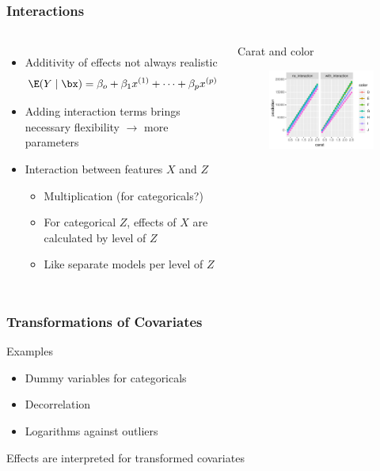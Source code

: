 \begin{frame}
	\frametitle{Interactions}
	\begin{columns}
		\begin{itemize}
			\item Additivity of effects not always realistic
			$$
			\E(Y \mid \bx) = \beta_o + \beta_1 x^{(1)} + \dots + \beta_p x^{(p)}
			$$
			\item Adding interaction terms brings necessary flexibility 
			$\rightarrow$ more parameters
			\item Interaction between features $X$ and $Z$
			\begin{itemize}
				\item Multiplication (for categoricals?)
				\item For categorical $Z$, effects of $X$ are calculated by level of $Z$
				\item Like separate models per level of $Z$
			\end{itemize}
		\end{itemize}
		
		\begin{block}{\centering Carat and color}
			\begin{figure}
				\includegraphics[width=\textwidth]{pics/interaction.pdf}
			\end{figure}
		\end{block}
	\end{columns}
\end{frame}

\begin{frame}
	\frametitle{Transformations of Covariates}
	\begin{block}{Examples}
		\begin{itemize}
			\item Dummy variables for categoricals
			\item Decorrelation
			\item Logarithms against outliers
		\end{itemize}
	\end{block}
	
	\vfill
	
	Effects are interpreted for transformed covariates
\end{frame}

